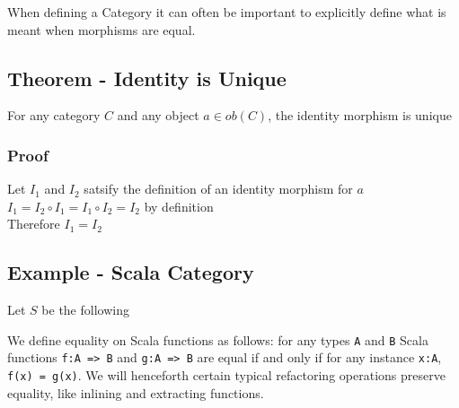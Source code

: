 \documentclass[9pt]{article} %
\begin{document}
When defining a Category it can often be important to explicitly define what is meant when morphisms are equal.

\subsection{Theorem - Identity is Unique}

For any category $C$ and any object $a \in ob(C)$, the identity morphism is unique

\subsubsection{Proof}

Let $I_1$ and $I_2$ satsify the definition of an identity morphism for $a$\newline
\\
\noindent $I_1 = I_2 \circ I_1 = I_1 \circ I_2 = I_2$ by definition
\\
\noindent Therefore $I_1 = I_2$ \blacksquare

\subsection{Example - Scala Category}

Let $S$ be the following


We define equality on Scala functions as follows: for any types \texttt{A} and \texttt{B} Scala functions \texttt{f:A => B} and \texttt{g:A => B} are equal if and only if for any instance \texttt{x:A}, \texttt{f(x) = g(x)}.  We will henceforth certain typical refactoring operations preserve equality, like inlining and extracting functions.
\end{document}
